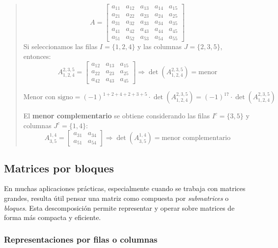 \begin{quote}
  \[
  A = \begin{bmatrix}
  a_{11} & a_{12} & a_{13} & a_{14} & a_{15} \\
  a_{21} & a_{22} & a_{23} & a_{24} & a_{25} \\
  a_{31} & a_{32} & a_{33} & a_{34} & a_{35} \\
  a_{41} & a_{42} & a_{43} & a_{44} & a_{45} \\
  a_{51} & a_{52} & a_{53} & a_{54} & a_{55}
  \end{bmatrix}
  \]
  Si seleccionamos las filas \(I = \{1,2,4\}\) y las columnas \(J = \{2,3,5\}\), entonces:
  \[
  A^{2,3,5}_{1,2,4} = 
  \begin{bmatrix}
  a_{12} & a_{13} & a_{15} \\
  a_{22} & a_{23} & a_{25} \\
  a_{42} & a_{43} & a_{45}
  \end{bmatrix}
  \Rightarrow 
  \det(A^{2,3,5}_{1,2,4}) = \text{menor}
  \]

  \[
  \text{Menor con signo} = (-1)^{1+2+4 + 2+3+5} \cdot \det(A^{2,3,5}_{1,2,4}) = (-1)^{17} \cdot \det(A^{2,3,5}_{1,2,4})
  \]

  El \textbf{menor complementario} se obtiene considerando las filas \(I^c = \{3,5\}\) y columnas \(J^c = \{1,4\}\):
  \[
  A^{1,4}_{3,5} = \begin{bmatrix}
  a_{31} & a_{34} \\
  a_{51} & a_{54}
  \end{bmatrix}
  \Rightarrow
  \det(A^{1,4}_{3,5}) = \text{menor complementario}
  \]
\end{quote}

\subsection{Matrices por bloques}

En muchas aplicaciones prácticas, especialmente cuando se trabaja con matrices grandes, resulta útil pensar una matriz como compuesta por \textit{submatrices} o \textit{bloques}. Esta descomposición permite representar y operar sobre matrices de forma más compacta y eficiente.

\subsubsection{Representaciones por filas o columnas}


